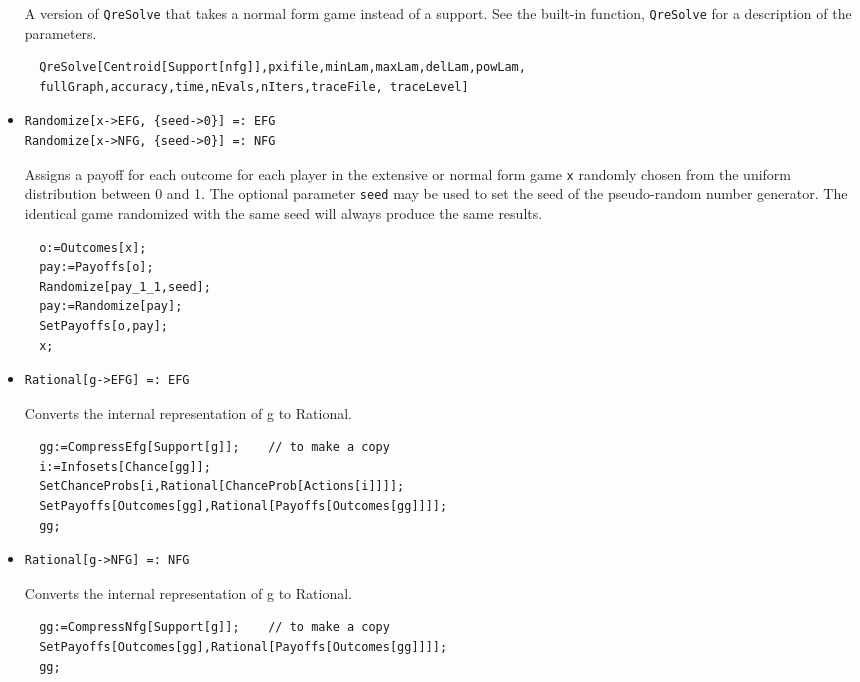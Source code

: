 \begin{itemize}
\bd 
A version of \verb+QreSolve+ that takes a normal form
game instead of a support.  See the built-in function,
\verb+QreSolve+ for a description of the parameters.
\begin{verbatim}
  QreSolve[Centroid[Support[nfg]],pxifile,minLam,maxLam,delLam,powLam,
  fullGraph,accuracy,time,nEvals,nIters,traceFile, traceLevel]
\end{verbatim} 
\ed


\item{}
\protect \large \begin{verbatim}
Randomize[x->EFG, {seed->0}] =: EFG 
Randomize[x->NFG, {seed->0}] =: NFG 
\end{verbatim}\normalsize

\bd 
Assigns a payoff for each outcome for each player in the extensive
or normal form game \verb+x+ randomly chosen from the uniform
distribution between 0 and 1.  The optional parameter \verb+seed+ may
be used to set the seed of the pseudo-random number generator.  The
identical game randomized with the same seed will always produce the
same results.
\begin{verbatim}
  o:=Outcomes[x];
  pay:=Payoffs[o];
  Randomize[pay_1_1,seed];
  pay:=Randomize[pay];
  SetPayoffs[o,pay];
  x;
\end{verbatim} 
\ed

\item{}
\protect \large \begin{verbatim}
Rational[g->EFG] =: EFG 
\end{verbatim}\normalsize

\bd 
Converts the internal representation of g to Rational.  
\begin{verbatim}
  gg:=CompressEfg[Support[g]];    // to make a copy
  i:=Infosets[Chance[gg]];
  SetChanceProbs[i,Rational[ChanceProb[Actions[i]]]];
  SetPayoffs[Outcomes[gg],Rational[Payoffs[Outcomes[gg]]]];
  gg;
\end{verbatim} 
\ed

\item{}
\protect \large \begin{verbatim}
Rational[g->NFG] =: NFG 
\end{verbatim}\normalsize

\bd 
Converts the internal representation of g to Rational.  
\begin{verbatim}
  gg:=CompressNfg[Support[g]];    // to make a copy
  SetPayoffs[Outcomes[gg],Rational[Payoffs[Outcomes[gg]]]];
  gg;
\end{verbatim} 
\ed


\end{itemize}
